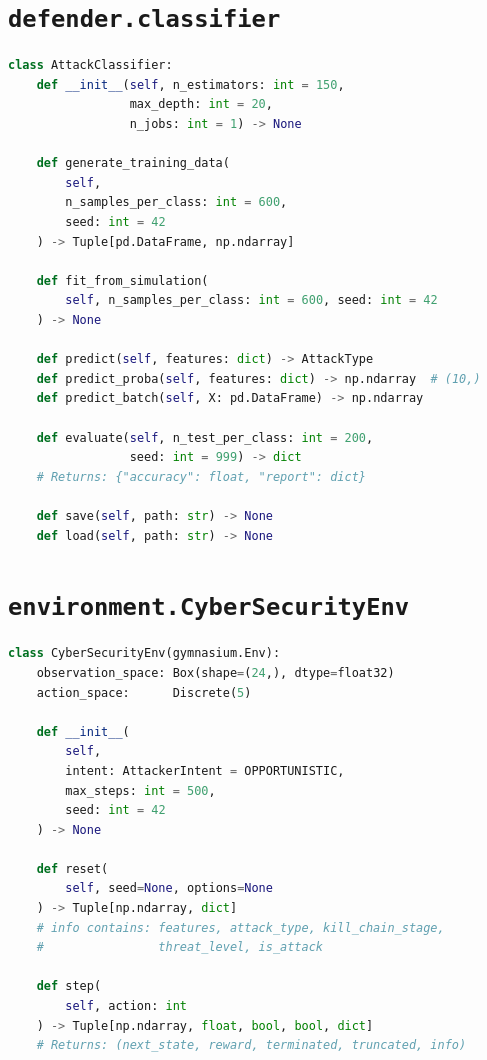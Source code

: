 \section{\texttt{defender.classifier}}

\begin{lstlisting}[language=Python, caption={Random Forest attack classifier interface.}]
class AttackClassifier:
    def __init__(self, n_estimators: int = 150,
                 max_depth: int = 20,
                 n_jobs: int = 1) -> None

    def generate_training_data(
        self,
        n_samples_per_class: int = 600,
        seed: int = 42
    ) -> Tuple[pd.DataFrame, np.ndarray]

    def fit_from_simulation(
        self, n_samples_per_class: int = 600, seed: int = 42
    ) -> None

    def predict(self, features: dict) -> AttackType
    def predict_proba(self, features: dict) -> np.ndarray  # (10,)
    def predict_batch(self, X: pd.DataFrame) -> np.ndarray

    def evaluate(self, n_test_per_class: int = 200,
                 seed: int = 999) -> dict
    # Returns: {"accuracy": float, "report": dict}

    def save(self, path: str) -> None
    def load(self, path: str) -> None
\end{lstlisting}

\section{\texttt{environment.CyberSecurityEnv}}

\begin{lstlisting}[language=Python, caption={Gymnasium environment interface.}]
class CyberSecurityEnv(gymnasium.Env):
    observation_space: Box(shape=(24,), dtype=float32)
    action_space:      Discrete(5)

    def __init__(
        self,
        intent: AttackerIntent = OPPORTUNISTIC,
        max_steps: int = 500,
        seed: int = 42
    ) -> None

    def reset(
        self, seed=None, options=None
    ) -> Tuple[np.ndarray, dict]
    # info contains: features, attack_type, kill_chain_stage,
    #                threat_level, is_attack

    def step(
        self, action: int
    ) -> Tuple[np.ndarray, float, bool, bool, dict]
    # Returns: (next_state, reward, terminated, truncated, info)
\end{lstlisting}

